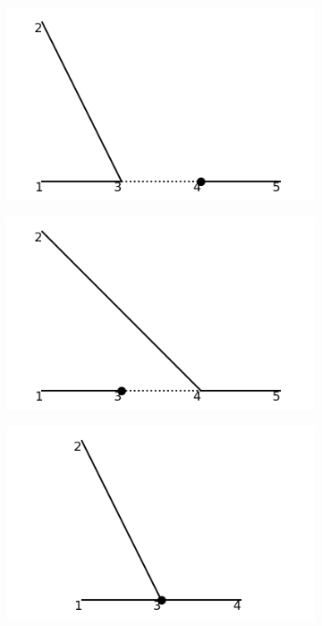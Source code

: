 \documentclass[11pt,a4paper,twoside,pdf]{article}
\numberwithin{equation}{section}
\begin{document}
\begin{figure}[h!]
\begin{subfigure}[t]{0.24\textwidth}
        \includegraphics[width=\textwidth]{plots/order3/order3_1to2/counterterms/4.png}
        \caption{ }
        \label{fig:order3_1to2/counterterms/4}
    \end{subfigure}
    \hfill
    \begin{subfigure}[t]{0.24\textwidth}
        \centering
        \includegraphics[width=\textwidth]{plots/order3/order3_1to2/counterterms/5.png}
        \caption{ }
        \label{fig:order3_1to2/counterterms/5}
    \end{subfigure}
    \hfill
    \centering
    \begin{subfigure}[t]{0.24\textwidth}
        \centering
        \includegraphics[width=\textwidth]{plots/order3/order3_1to2/counterterms/1.png}

\end{subfigure}
\end{figure}
\end{document}
